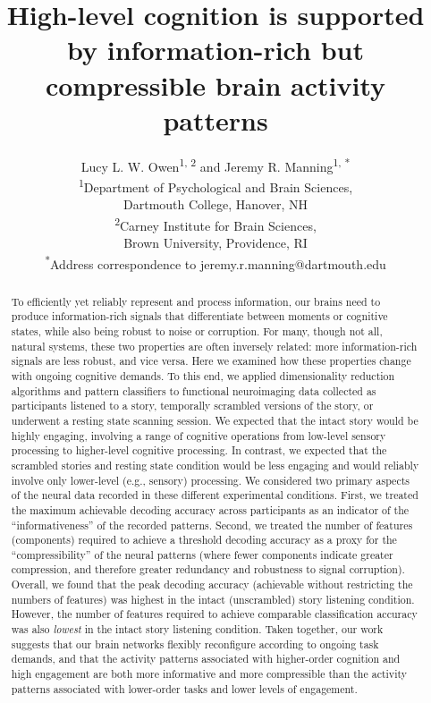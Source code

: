 \documentclass[english, 11pt]{article}
\title{High-level cognition is supported by information-rich but compressible brain activity patterns}
\author{Lucy L. W. Owen\textsuperscript{1, 2} and Jeremy R. Manning\textsuperscript{1,
*}\\\textsuperscript{1}Department of Psychological and Brain Sciences,\\Dartmouth College,
Hanover, NH\\[0.1cm]\textsuperscript{2}Carney Institute for Brain Sciences,\\Brown University,
Providence, RI\\[0.1cm] \textsuperscript{*}Address correspondence to
jeremy.r.manning@dartmouth.edu}
\begin{document}
\maketitle


\begin{abstract}

To efficiently yet reliably represent and process information, our brains need
to produce information-rich signals that differentiate between moments or
cognitive states, while also being robust to noise or corruption. For many,
though not all, natural systems, these two properties are often inversely
related: more information-rich signals are less robust, and vice versa. Here
we examined how these properties change with ongoing cognitive demands.
To this end, we applied dimensionality reduction algorithms and pattern
classifiers to functional neuroimaging data collected as participants listened
to a story, temporally scrambled versions of the story, or underwent a resting
state scanning session. We expected that the intact story would be highly
engaging, involving a range of cognitive operations from low-level sensory
processing to higher-level cognitive processing. In contrast, we expected that
the scrambled stories and resting state condition would be less engaging and
would reliably involve only lower-level (e.g., sensory) processing. We
considered two primary aspects of the neural data recorded in these different
experimental conditions. First, we treated the maximum achievable decoding
accuracy across participants as an indicator of the ``informativeness'' of the
recorded patterns. Second, we treated the number of features (components)
required to achieve a threshold decoding accuracy as a proxy for the
``compressibility'' of the neural patterns (where fewer components indicate
greater compression, and therefore greater redundancy and robustness to signal
corruption). Overall, we found that the peak decoding accuracy (achievable
without restricting the numbers of features) was highest in the intact
(unscrambled) story listening condition. However, the number of features
required to achieve comparable classification accuracy was also \textit{lowest}
in the intact story listening condition. Taken together, our work suggests that
our brain networks flexibly reconfigure according to ongoing task demands, and
that the activity patterns associated with higher-order cognition and high
engagement are both more informative and more compressible than the activity
patterns associated with lower-order tasks and lower levels of engagement.


\end{abstract}
\end{document}

